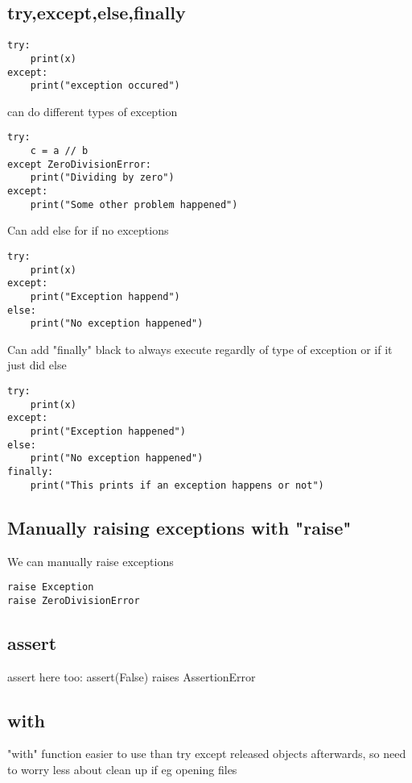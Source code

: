 
\subsection{try,except,else,finally}

\begin{verbatim}
try:
    print(x)
except:
    print("exception occured")
\end{verbatim}

can do different types of exception

\begin{verbatim}
try:
    c = a // b
except ZeroDivisionError:
    print("Dividing by zero")
except:
    print("Some other problem happened")
\end{verbatim}

Can add else for if no exceptions

\begin{verbatim}
try:
    print(x)
except:
    print("Exception happend")
else:
    print("No exception happened")
\end{verbatim}

Can add "finally" black to always execute regardly of type of exception or if it just did else

\begin{verbatim}
try:
    print(x)
except:
    print("Exception happened")
else:
    print("No exception happened")
finally:
    print("This prints if an exception happens or not")
\end{verbatim}

\subsection{Manually raising exceptions with "raise"}

We can manually raise exceptions

\begin{verbatim}
raise Exception
raise ZeroDivisionError
\end{verbatim}

\subsection{assert}
assert here too:
assert(False)
raises AssertionError


\subsection{with}

"with" function
easier to use than try except
released objects afterwards, so need to worry less about clean up if eg opening files

